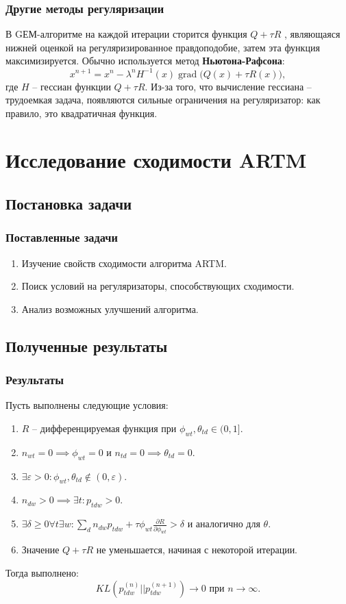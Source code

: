 \documentclass[utf8]{beamer}
\DeclareMathOperator{\grad}{grad}
\begin{document}
	\begin{frame}
		\frametitle{Другие методы регуляризации}
		В GЕМ-алгоритме на каждой итерации сторится функция $Q + \tau R$ , являющаяся нижней оценкой на регуляризированное правдоподобие, затем эта функция максимизируется. Обычно используется метод \textbf{Ньютона-Рафсона}:
\[
x^{n+1} = x^{n} - \lambda^{n} H^{-1}(x) \grad{\big(Q(x) + \tau R(x)\big)},
\]
где $H$ -- гессиан функции $Q + \tau R$. Из-за того, что вычисление гессиана -- трудоемкая задача, появляются сильные ограничения на регуляризатор: как правило, это квадратичная функция.
	\end{frame}

	\section{Исследование сходимости ARTM}
	\subsection{Постановка задачи}
	
	\begin{frame}
		\frametitle{Поставленные задачи}
\begin{enumerate}
\item Изучение свойств сходимости алгоритма ARTM.
\item Поиск условий на регуляризаторы, способствующих сходимости.
\item Анализ возможных улучшений алгоритма.
\end{enumerate}
	\end{frame}

	\subsection{Полученные результаты}
	
	\begin{frame}
		\frametitle{Результаты}
Пусть выполнены следующие условия:
\begin{enumerate}
\item  $R$ -- дифференцируемая функция при $\phi_{wt}, \theta_{td} \in (0, 1]$.
\item  $n_{wt} = 0 \implies \phi_{wt} = 0$ и $n_{td} = 0 \implies \theta_{td} = 0$.
\item $\exists \varepsilon > 0 \colon \phi_{wt}, \theta_{td} \notin (0, \varepsilon)$.
\item  $n_{dw} > 0 \implies \exists t\colon p_{tdw} > 0$.
\item $\exists \delta \geq 0 \forall t \exists w \colon \sum\limits_d n_{dw} p_{tdw} + \tau\phi_{wt} \frac{\partial{R}}{\partial{\phi_{wt}}} > \delta$ и аналогично для $\theta$.
\item Значение $Q + \tau R$ не уменьшается, начиная с некоторой итерации.
\end{enumerate}
Тогда выполнено:
\[
KL(p_{tdw}^{(n)}||p_{tdw}^{(n + 1)}) \to 0 \text{ при } n \to \infty.
\]
	\end{frame}
	
\end{document}
